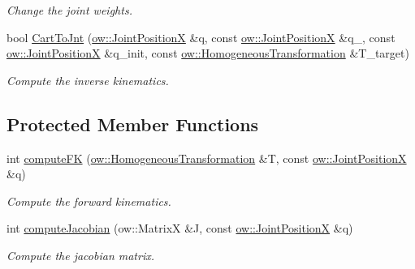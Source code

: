 \begin{DoxyCompactItemize}
\begin{DoxyCompactList}\small\item\em Change the joint weights. \end{DoxyCompactList}\item 
bool \hyperlink{classow__ik_1_1IkSolverNullspace_a49c4da319b705341c17440e8434e1bce}{Cart\+To\+Jnt} (\hyperlink{classow__core_1_1JointPosition}{ow\+::\+Joint\+PositionX} \&q, const \hyperlink{classow__core_1_1JointPosition}{ow\+::\+Joint\+PositionX} \&q\+\_, const \hyperlink{classow__core_1_1JointPosition}{ow\+::\+Joint\+PositionX} \&q\+\_\+init, const \hyperlink{classow__core_1_1HomogeneousTransformation}{ow\+::\+Homogeneous\+Transformation} \&T\+\_\+target)
\begin{DoxyCompactList}\small\item\em Compute the inverse kinematics. \end{DoxyCompactList}\end{DoxyCompactItemize}
\subsection*{Protected Member Functions}
\begin{DoxyCompactItemize}
\item 
int \hyperlink{classow__ik_1_1IkSolverNullspace_ae29f9061f0b77545ddaedbd5699b528c}{compute\+FK} (\hyperlink{classow__core_1_1HomogeneousTransformation}{ow\+::\+Homogeneous\+Transformation} \&T, const \hyperlink{classow__core_1_1JointPosition}{ow\+::\+Joint\+PositionX} \&q)
\begin{DoxyCompactList}\small\item\em Compute the forward kinematics. \end{DoxyCompactList}\item 
int \hyperlink{classow__ik_1_1IkSolverNullspace_aec8e0d6607bdd703955adf7334ae6fb7}{compute\+Jacobian} (ow\+::\+MatrixX \&J, const \hyperlink{classow__core_1_1JointPosition}{ow\+::\+Joint\+PositionX} \&q)\hypertarget{classow__ik_1_1IkSolverNullspace_aec8e0d6607bdd703955adf7334ae6fb7}{}\label{classow__ik_1_1IkSolverNullspace_aec8e0d6607bdd703955adf7334ae6fb7}

\begin{DoxyCompactList}\small\item\em Compute the jacobian matrix. \end{DoxyCompactList}\end{DoxyCompactItemize}
